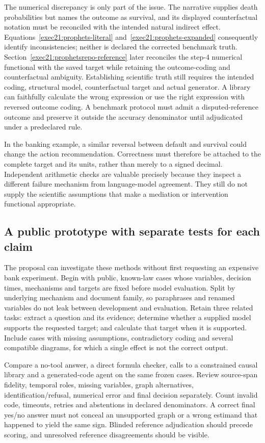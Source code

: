 The numerical discrepancy is only part of the issue. The narrative supplies
death probabilities but names the outcome as survival, and its displayed
counterfactual notation must be reconciled with the intended natural indirect
effect. Equations~\eqref{exec21:prophets-literal}
and~\eqref{exec21:prophets-expanded} consequently identify inconsistencies;
neither is declared the corrected benchmark truth. Section~\ref{exec21:prophetsrepo-reference} later reconciles the step-4 numerical functional with the saved target while retaining the outcome-coding and counterfactual ambiguity. Establishing scientific truth still requires the intended coding, structural model, counterfactual target and actual generator. A library can faithfully calculate the wrong expression or
use the right expression with reversed outcome coding. A benchmark protocol
must admit a disputed-reference outcome and preserve it outside the accuracy
denominator until adjudicated under a predeclared rule.

In the banking example, a similar reversal between default and survival could
change the action recommendation. Correctness must therefore be attached to
the complete target and its units, rather than merely to a signed decimal.
Independent arithmetic checks are valuable precisely because they inspect a
different failure mechanism from language-model agreement. They still do not
supply the scientific assumptions that make a mediation or intervention
functional appropriate.

\subsection{A public prototype with separate tests for each claim}
\label{exec21:prophets-validation}
The proposal can investigate these methods without first requesting an expensive
bank experiment. Begin with public, known-law cases whose variables, decision
times, mechanisms and targets are fixed before model evaluation. Split by
underlying mechanism and document family, so paraphrases and renamed variables
do not leak between development and evaluation. Retain three related tasks:
extract a question and its evidence; determine whether a supplied model supports
the requested target; and calculate that target when it is supported. Include
cases with missing assumptions, contradictory coding and several compatible
diagrams, for which a single effect is not the correct output.

Compare a no-tool answer, a direct formula checker, calls to a constrained
causal library and a generated-code agent on the same frozen cases. Review
source-span fidelity, temporal roles, missing variables, graph alternatives,
identification/refusal, numerical error and final decision separately. Count
invalid code, timeouts, retries and abstentions in declared denominators. A
correct final yes/no answer must not conceal an unsupported graph or a wrong
estimand that happened to yield the same sign. Blinded reference adjudication
should precede scoring, and unresolved reference disagreements should be visible.

